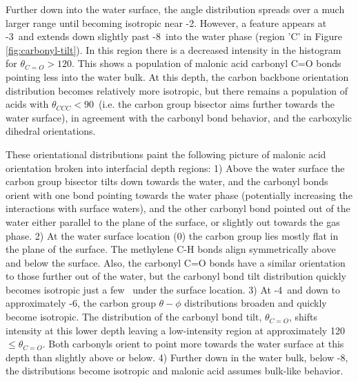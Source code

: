 Further down into the water surface, the angle distribution spreads over a much larger range until becoming isotropic near -2\angs. However, a feature appears at -3\angs~and extends down slightly past -8\angs~into the water phase (region 'C' in Figure \ref{fig:carbonyl-tilt}). In this region there is a decreased intensity in the histogram for $\theta_{C=O} > 120$\textdegree. This shows a population of malonic acid carbonyl C=O bonds pointing less into the water bulk. At this depth, the carbon backbone orientation distribution becomes relatively more isotropic, but there remains a population of acids with $\theta_{CCC} < 90$\textdegree~(i.e. the carbon group bisector aims further towards the water surface), in agreement with the carbonyl bond behavior, and the carboxylic dihedral orientations.

These orientational distributions paint the following picture of malonic acid orientation broken into interfacial depth regions: 1) Above the water surface the carbon group bisector tilts down towards the water, and the carbonyl bonds orient with one bond pointing towards the water phase (potentially increasing the interactions with surface waters), and the other carbonyl bond pointed out of the water either parallel to the plane of the surface, or slightly out towards the gas phase. 2) At the water surface location (0\angs) the carbon group lies mostly flat in the plane of the surface. The methylene C-H bonds align symmetrically above and below the surface. Also, the carbonyl C=O bonds have a similar orientation to those further out of the water, but the carbonyl bond tilt distribution quickly becomes isotropic just a few \angs~under the surface location. 3) At -4\angs~and down to approximately -6\angs, the carbon group $\theta-\phi$ distributions broaden and quickly become isotropic. The distribution of the carbonyl bond tilt, $\theta_{C=O}$, shifts intensity at this lower depth leaving a low-intensity region at approximately 120\textdegree~$\le \theta_{C=O}$. Both carbonyls orient to point more towards the water surface at this depth than slightly above or below. 4) Further down in the water bulk, below -8\angs, the distributions become isotropic and malonic acid assumes bulk-like behavior.
